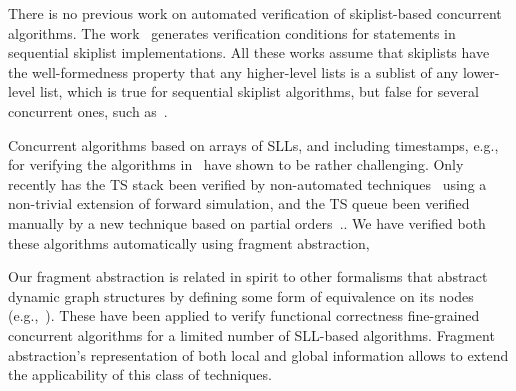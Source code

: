 There is no previous work on automated verification of skiplist-based concurrent algorithms. The work~\cite{Sanchez:skiplists}
generates verification conditions for statements in sequential skiplist implementations. All these
works assume that skiplists have the well-formedness property that any higher-level lists is a
sublist of any lower-level list, which is true for sequential skiplist algorithms, but false for
several concurrent ones, such as~\cite{ArtOfMpP,Linden:opodis13}.



Concurrent algorithms based on arrays of SLLs, and including timestamps, e.g.,
for verifying the algorithms in~\cite{ts-stack} have shown to be rather challenging. Only
recently has the TS stack been verified by non-automated
techniques~\cite{BEEM:cav17} using a non-trivial extension of
forward simulation, and the TS queue been verified manually by a new technique
based on partial orders~\cite{Khyzha:esop17,singh:issre16}..
We have verified both these algorithms automatically using fragment abstraction,

Our fragment abstraction is related in spirit to other formalisms that
abstract dynamic graph structures by defining some form of equivalence on
its nodes (e.g.,~\cite{spotlight07,SagivRW02}). These have
been applied to verify functional correctness fine-grained concurrent
algorithms for a limited number of SLL-based algorithms. Fragment
abstraction's representation of both local and global information allows to
extend the applicability of this class of techniques.
%
%
%
%
%
